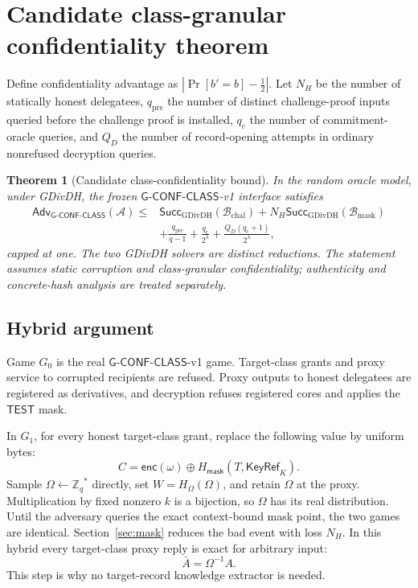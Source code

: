 \documentclass[11pt,letterpaper]{article}
\newtheorem{theorem}{Theorem}[section]
\theoremstyle{definition}
\theoremstyle{remark}
\newcommand{\Adv}{\ensuremath{\mathsf{Adv}}}
\newcommand{\Succ}{\ensuremath{\mathsf{Succ}}}
\newcommand{\GClass}{\ensuremath{\mathsf{G\text{-}CONF\text{-}CLASS}}\xspace}
\newcommand{\Zq}{\ensuremath{\mathbb{Z}_q}}
\newcommand{\KeyRef}{\ensuremath{\mathsf{KeyRef}}}
\newcommand{\Hmask}{\ensuremath{H_{\mathsf{mask}}}}
\newcommand{\HOmega}{\ensuremath{H_{\Omega}}}
\newcommand{\TEST}{\ensuremath{\mathsf{TEST}}}
\begin{document}
\section{Candidate class-granular confidentiality theorem}
\label{sec:class-proof}

Define confidentiality advantage as
\(\left|\Pr[b'=b]-\tfrac12\right|\).  Let \(N_H\) be the number of statically
honest delegatees, \(q_{\mathrm{pre}}\) the number of distinct challenge-proof
inputs queried before the challenge proof is installed, \(q_c\) the number of
commitment-oracle queries, and \(Q_D\) the number of record-opening attempts in
ordinary nonrefused decryption queries.

\begin{theorem}[Candidate class-confidentiality bound]
\label{thm:class}
In the random oracle model, under GDivDH, the frozen \GClass-v1 interface satisfies
\begin{align*}
\Adv_{\GClass}(\mathcal A)
\le{}& \Succ_{\mathrm{GDivDH}}(\mathcal B_{\mathrm{chal}})
 + N_H\Succ_{\mathrm{GDivDH}}(\mathcal B_{\mathrm{mask}})\\
&+\frac{q_{\mathrm{pre}}}{q-1}
 +\frac{q_c}{2^\lambda}
 +\frac{Q_D(q_c+1)}{2^\lambda},
\end{align*}
capped at one.  The two GDivDH solvers are distinct reductions.  The statement
assumes static corruption and class-granular confidentiality; authenticity and
concrete-hash analysis are treated separately.
\end{theorem}

\subsection{Hybrid argument}

Game \(G_0\) is the real \GClass-v1 game.  Target-class grants and proxy service
to corrupted recipients are refused.  Proxy outputs to honest delegatees are
registered as derivatives, and decryption refuses registered cores and applies
the \(\TEST\) mask.

In \(G_1\), for every honest target-class grant, replace the following value by
uniform bytes:
\[
 C=\mathsf{enc}(\omega)\oplus\Hmask(T,\KeyRef_K).
\]
Sample
\(\Omega\leftarrow\Zq^*\) directly, set \(W=\HOmega(\Omega)\), and retain
\(\Omega\) at the proxy.  Multiplication by fixed nonzero \(k\) is a bijection,
so \(\Omega\) has its real distribution.  Until the adversary queries the exact
context-bound mask point, the two games are identical.  Section~\ref{sec:mask}
reduces the bad event with loss \(N_H\).  In this hybrid every target-class proxy
reply is exact for arbitrary input:
\[
  \bar A=\Omega^{-1}A.
\]
This step is why no target-record knowledge extractor is needed.
\end{document}
